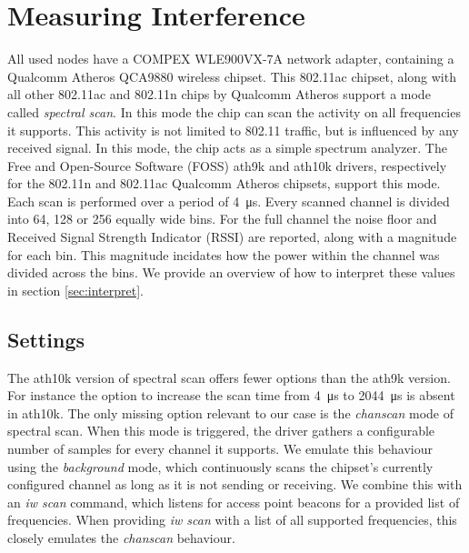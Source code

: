 \documentclass[a4paper, 11pt]{article}
\begin{document}
\section{Measuring Interference}
All used nodes have a COMPEX WLE900VX-7A network adapter, containing a Qualcomm Atheros QCA9880 wireless chipset. This 802.11ac chipset, along with all other 802.11ac and 802.11n chips by Qualcomm Atheros support a mode called \textit{spectral scan}. In this mode the chip can scan the activity on all frequencies it supports. This activity is not limited to 802.11 traffic, but is influenced by any received signal. In this mode, the chip acts as a simple spectrum analyzer. The Free and Open-Source Software (FOSS) ath9k and ath10k drivers, respectively for the 802.11n and 802.11ac Qualcomm Atheros chipsets, support this mode. Each scan is performed over a period of \SI{4}{\micro\second}. Every scanned channel is divided into 64, 128 or 256 equally wide bins. For the full channel the noise floor and Received Signal Strength Indicator (RSSI) are reported, along with a magnitude for each bin. This magnitude incidates  how the power within the channel was divided across the bins. We provide an overview of how to interpret these values in section \ref{sec:interpret}. \\
\subsection{Settings}
The ath10k version of spectral scan offers fewer options than the ath9k version. For instance the option to increase the scan time from \SI{4}{\micro\second} to \SI{2044}{\micro\second} is absent in ath10k. The only missing option relevant to our case is the \textit{chanscan} mode of spectral scan. When this mode is triggered, the driver gathers a configurable number of samples for every channel it supports. We emulate this behaviour using the \textit{background} mode, which continuously scans the chipset's currently configured channel as long as it is not sending or receiving. We combine this with an \textit{iw scan} command, which listens for access point beacons for a provided list of frequencies. When providing \textit{iw scan} with a list of all supported frequencies, this closely emulates the \textit{chanscan} behaviour.
\end{document}
